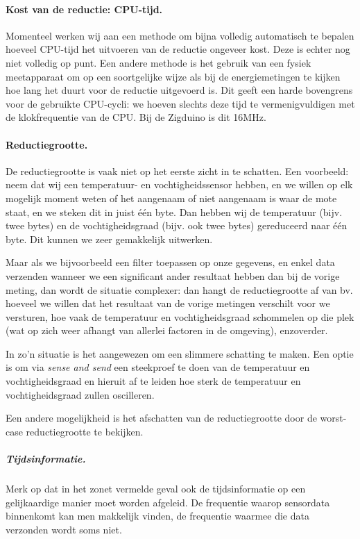 \documentclass[11pt]{article}
\begin{document}
\paragraph{Kost van de reductie: CPU-tijd.} Momenteel werken wij aan een
methode om bijna volledig automatisch te bepalen hoeveel CPU-tijd het uitvoeren
van de reductie ongeveer kost. Deze is echter nog niet volledig op punt. Een
andere methode is het gebruik van een fysiek meetapparaat om op een soortgelijke
wijze als bij de energiemetingen te kijken hoe lang het duurt voor de reductie
uitgevoerd is. Dit geeft een harde bovengrens voor de gebruikte CPU-cycli: we
hoeven slechts deze tijd te vermenigvuldigen met de klokfrequentie van de
CPU. Bij de Zigduino is dit 16MHz.

\paragraph{Reductiegrootte.} De reductiegrootte is vaak
niet op het eerste zicht in te schatten. Een voorbeeld: neem dat wij een
temperatuur- en vochtigheidssensor hebben, en we willen op elk mogelijk moment
weten of het aangenaam of niet aangenaam is waar de mote staat, en we steken dit
in juist één byte. Dan hebben wij de temperatuur (bijv. twee bytes) en de
vochtigheidsgraad (bijv. ook twee bytes) gereduceerd naar \'e\'en byte. Dit
kunnen we zeer gemakkelijk uitwerken.

Maar als we bijvoorbeeld een filter toepassen op onze gegevens, en enkel data
verzenden wanneer we een significant ander resultaat hebben dan bij de vorige
meting, dan wordt de situatie complexer: dan hangt de reductiegrootte af van
bv. hoeveel we willen dat het resultaat van de vorige metingen verschilt voor we
versturen, hoe vaak de temperatuur en vochtigheidsgraad schommelen op die plek
(wat op zich weer afhangt van allerlei factoren in de omgeving), enzoverder.

In zo'n situatie is het aangewezen om een slimmere schatting te maken. Een optie
is om via \textit{sense and send} een steekproef te doen van de temperatuur en
vochtigheidsgraad en hieruit af te leiden hoe sterk de temperatuur en
vochtigheidsgraad zullen oscilleren.

Een andere mogelijkheid is het afschatten van de reductiegrootte door de
worst-case reductiegrootte te bekijken.

\subparagraph{Tijdsinformatie.} Merk op dat in het zonet vermelde geval ook de
tijdsinformatie op een gelijkaardige manier moet worden afgeleid. De frequentie
waarop sensordata binnenkomt kan men makkelijk vinden, de frequentie waarmee die
data verzonden wordt soms niet. 
\end{document}
